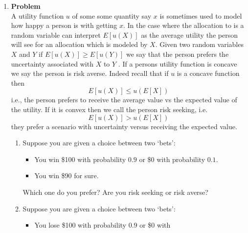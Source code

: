 \documentclass[12pt]{article}
\newenvironment{Ex}{\textbf{Problem}\vspace{.75em}\\}{}
\begin{document}
\begin{enumerate}
\begin{Ex}
\begin{enumerate}
        values only and $g$ is convex. Show that $E[g(X)] \ge
        g(E[X])$. It follows that if $g$ is concave then $E[g(X)] \le
        g(E[X])$.
      \item This result is true in general, i.e., for any kind of
        random variable. To convince yourself, can you extend this
        result to the case $X$ a discrete random variables that takes
        three values? Hint: you could perhaps condition...
      \end{enumerate}
      \begin{solution} \hfill \\
        {\huge TODO}
      \end{solution}
    \end{Ex}
  \item 
    \begin{Ex}
      A utility function $u$ of some some quantity say $x$ is sometimes
      used to model how happy a person is with getting $x$. In the case
      where the allocation to is a random variable can interpret
      $E[u(X)]$ as the average utility the person will see for an
      allocation which is modeled by $X$. Given two random variables $X$
      and $Y$ if $E [u(X)] \ge E [u(Y)]$ we say that the person prefers
      the uncertainty associated with $X$ to $Y$ . If a persons utility
      function is concave we say the person is risk averse. Indeed
      recall that if $u$ is a concave function then
      $$ E[u(X)] \le u(E[X]) $$
      i.e., the person prefers to receive the average value vs the
      expected value of the utility. If it is convex then we call the
      person risk seeking, i.e.
      $$ E[u(X)] \gt u(E[X]) $$
      they prefer a scenario with uncertainty versus receiving the expected value.
      \begin{enumerate}
      \item Suppose you are given a choice between two `bets':
        \begin{itemize}
        \item You win \$100 with probability $0.9$ or \$0 with
          probability $0.1$.
        \item You win \$90 for sure.
        \end{itemize}
        Which one do you prefer? Are you risk
        seeking or risk averse? 
      \item Suppose you are given a choice
        between two `bets':
        \begin{itemize}
        \item You lose \$100 with probability $0.9$ or \$0 with

\end{itemize}
\end{enumerate}
\end{Ex}
\end{enumerate}
\end{document}
